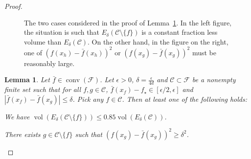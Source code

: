 \documentclass[letter, 12pt]{report}
\newcommand{\cC}{\mathcal C}
\newcommand{\sF}{\mathscr F}
\newcommand{\vol}{\operatorname{vol}}
\newcommand{\conv}{\operatorname{conv}}
\newcommand{\1}{\mathbf{1}}
\theoremstyle{plain}
\newtheorem{lemma}[theorem]{Lemma}
\theoremstyle{definition}
\theoremstyle{remark}
\begin{document}
\begin{proof}
\begin{figure}[h!]
\begin{tikzpicture}[scale=0.75]
        \end{tikzpicture}

        \caption{The two cases considered in the proof of Lemma~\ref{lem:ridge-ir-1}.
            In the left figure, the situation is such that $E_\delta(\cC \setminus \{f\})$ is a constant fraction less volume than $E_\delta(\cC)$.
            On the other hand, in the figure on the right, one of $(f(x_h) - \bar f(x_h))^2$ or $(f(x_g) - \bar f(x_g))^2$ must be reasonably large.}
        \label{fig:ir-ridge}
    \end{figure}

    \FloatBarrier
    \begin{lemma}\label{lem:ridge-ir-1}
        Let $\bar{f} \in \conv(\sF)$.
        Let $\epsilon > 0$, $\delta = \frac{\epsilon}{4d}$ and $\cC \subset \sF$ be a nonempty finite set such that for all $f, g \in \cC$,
        $\bar f(x_f) - f_\star \in [\epsilon/2, \epsilon]$ and
        $|\bar f(x_f) - \bar f(x_g)| \leq \delta$.
        Pick any $f \in \cC$.
        Then at least one of the following holds:
        \begin{enumroman}
            \item We have $\vol(E_\delta(\cC \setminus \{f\})) \leq 0.85 \vol(E_\delta(\cC))$. \label{lem:ridge-ir-1:a}
            \item There exists $g \in \cC\setminus\{f\}$ such that $(f(x_g) - \bar f(x_g))^2 \geq \delta^2$. \label{lem:ridge-ir-1:b}
        \end{enumroman}
    \end{lemma}


\end{proof}
\end{document}
